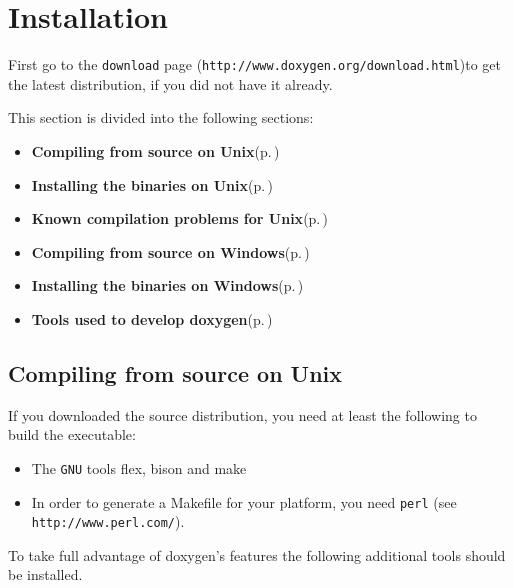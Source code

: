 \section{Installation}\label{install}
 First go to the {\tt download} page ({\tt http://www.doxygen.org/download.html})to get the latest distribution, if you did not have it already.

This section is divided into the following sections: \begin{itemize}
\item {\bf Compiling from source on Unix}{\rm (p.\,\pageref{install_install_src_unix})} \item {\bf Installing the binaries on Unix}{\rm (p.\,\pageref{install_install_bin_unix})} \item {\bf Known compilation problems for Unix}{\rm (p.\,\pageref{install_unix_problems})} \item {\bf Compiling from source on Windows}{\rm (p.\,\pageref{install_install_src_windows})} \item {\bf Installing the binaries on Windows}{\rm (p.\,\pageref{install_install_bin_windows})} \item {\bf Tools used to develop doxygen}{\rm (p.\,\pageref{install_build_tools})} \end{itemize}
\subsection{Compiling from source on Unix}\label{install_install_src_unix}
If you downloaded the source distribution, you need at least the following to build the executable: \begin{itemize}
\item The {\tt GNU} tools flex, bison and make    \item In order to generate a Makefile for your platform, you need {\tt perl} (see {\tt http://www.perl.com/}).  \end{itemize}


To take full advantage of doxygen's features the following additional tools should be installed.


